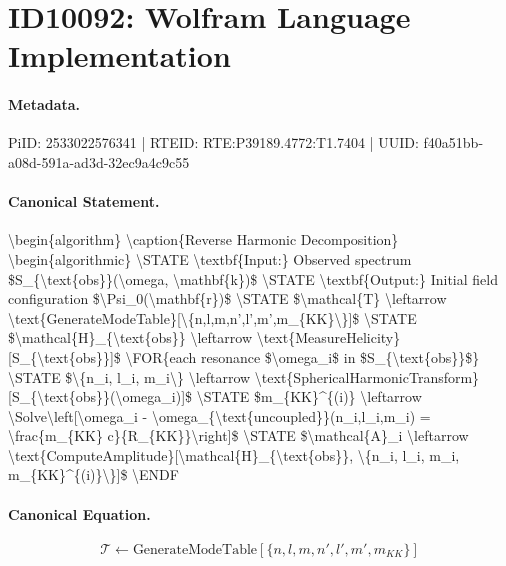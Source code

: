 \section*{ID10092: Wolfram Language Implementation}
\paragraph{Metadata.}
PiID: 2533022576341 | RTEID: RTE:P39189.4772:T1.7404 | UUID: f40a51bb-a08d-591a-ad3d-32ec9a4c9c55

\paragraph{Canonical Statement.}
\textbackslash{}begin\{algorithm\} \textbackslash{}caption\{Reverse Harmonic Decomposition\} \textbackslash{}begin\{algorithmic\} \textbackslash{}STATE \textbackslash{}textbf\{Input:\} Observed spectrum \$S\_\{\textbackslash{}text\{obs\}\}(\textbackslash{}omega, \textbackslash{}mathbf\{k\})\$ \textbackslash{}STATE \textbackslash{}textbf\{Output:\} Initial field configuration \$\textbackslash{}Psi\_0(\textbackslash{}mathbf\{r\})\$ \textbackslash{}STATE \$\textbackslash{}mathcal\{T\} \textbackslash{}leftarrow \textbackslash{}text\{GenerateModeTable\}[\textbackslash{}\{n,l,m,n',l',m',m\_\{KK\}\textbackslash{}\}]\$ \textbackslash{}STATE \$\textbackslash{}mathcal\{H\}\_\{\textbackslash{}text\{obs\}\} \textbackslash{}leftarrow \textbackslash{}text\{MeasureHelicity\}[S\_\{\textbackslash{}text\{obs\}\}]\$ \textbackslash{}FOR\{each resonance \$\textbackslash{}omega\_i\$ in \$S\_\{\textbackslash{}text\{obs\}\}\$\} \textbackslash{}STATE \$\textbackslash{}\{n\_i, l\_i, m\_i\textbackslash{}\} \textbackslash{}leftarrow \textbackslash{}text\{SphericalHarmonicTransform\}[S\_\{\textbackslash{}text\{obs\}\}(\textbackslash{}omega\_i)]\$ \textbackslash{}STATE \$m\_\{KK\}\textasciicircum{}\{(i)\} \textbackslash{}leftarrow \textbackslash{}Solve\textbackslash{}left[\textbackslash{}omega\_i - \textbackslash{}omega\_\{\textbackslash{}text\{uncoupled\}\}(n\_i,l\_i,m\_i) = \textbackslash{}frac\{m\_\{KK\} c\}\{R\_\{KK\}\}\textbackslash{}right]\$ \textbackslash{}STATE \$\textbackslash{}mathcal\{A\}\_i \textbackslash{}leftarrow \textbackslash{}text\{ComputeAmplitude\}[\textbackslash{}mathcal\{H\}\_\{\textbackslash{}text\{obs\}\}, \textbackslash{}\{n\_i, l\_i, m\_i, m\_\{KK\}\textasciicircum{}\{(i)\}\textbackslash{}\}]\$ \textbackslash{}ENDF

\paragraph{Canonical Equation.}
\[
\mathcal{T} \leftarrow \text{GenerateModeTable}[\{n,l,m,n',l',m',m_{KK}\}]
\]

